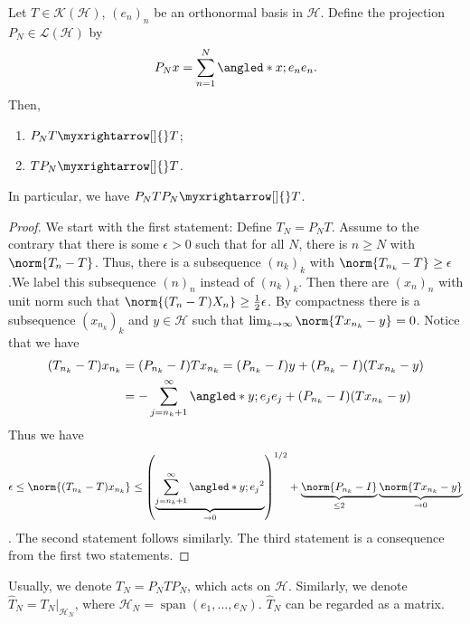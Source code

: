 \begin{thm}
    Let \( T \in \mathcal{K}(\mathcal{H}) \), \( (e_n)_n \) be an orthonormal basis in \( \mathcal{H} \). Define the projection \( P_N \in \mathcal{L}(\mathcal{H}) \) by 
    \[ P_Nx = \sum_{n=1}^{N} \angled*{x;e_n}e_n.\]
    Then,
    \begin{enumerate}[1)]
      \item \( P_NT \myxrightarrow[]{} T\);
      \item \( TP_N \myxrightarrow[]{} T\).
    \end{enumerate}
    In particular, we have \( P_NTP_N \myxrightarrow[]{} T \).
\end{thm}
\begin{proof}
    We start with the first statement: Define \( T_N=P_NT \). Assume to the contrary that there is some \( \epsilon > 0 \) such that for all \( N \), there is \( n\geq N \) with \( \norm{T_n-T}_{} \). Thus, there is a subsequence \( (n_k)_k \) with \( \norm{T_{n_k}-T}_{}\geq \epsilon \).We label this subsequence \( (n)_n \) instead of \( (n_k)_k \). Then there are \( (x_n)_n \) with unit norm such that \( \norm{(T_n-T)X_n}_{} \geq \frac{1}{2}\epsilon \). By compactness there is a subsequence \( (x_{n_{k}})_k \) and \( y \in \mathcal{H} \) such that \( \lim_{k \to \infty} \norm{Tx_{n_k}-y}_{}=0 \). Notice that we have
    \begin{align*}
      (T_{n_k}-T)x_{n_k} &= (P_{n_k}-I)Tx_{n_k} = (P_{n_k}-I)y + (P_{n_k}-I)(Tx_{n_k}-y) \\
                         &= - \sum_{j=n_k+1}^{\infty} \angled*{y;e_j}e_j + (P_{n_k}-I)(Tx_{n_k}-y)
    \end{align*}
  Thus we have 
  \[ \epsilon \leq \norm{(T_{n_k}-T)x_{n_k}}_{} \leq \left(\underbrace{\sum_{j=n_k+1}^{\infty}\angled*{y;e_j}^{2}}_{\to 0}\right)^{1/2} + \underbrace{\norm{P_{n_k}-I}}_{\leq 2} \underbrace{\norm{Tx_{n_k}-y}}_{\to 0}\].
  The second statement follows similarly. The third statement is a consequence from the first two statements. 
\end{proof}



\begin{nota}[]
    Usually, we denote \( T_N = P_NTP_N \), which acts on \( \mathcal{H} \). Similarly, we denote \( \widehat{T}_N=T_N\vert_{\mathcal{H}_N} \), where \( \mathcal{H}_N= \operatorname{span}(e_1,\dots,e_N) \). \( \widehat{T}_N \) can be regarded as a matrix. 
\end{nota}


